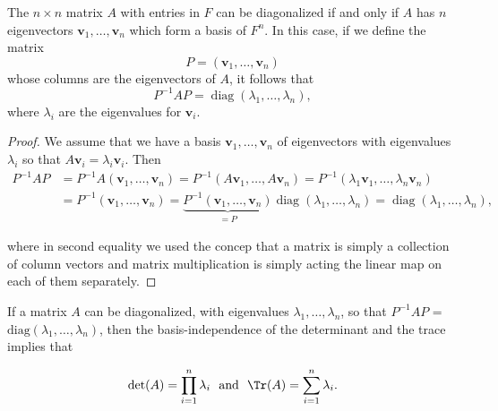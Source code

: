 \documentclass[a4paper,12pt]{report}
\begin{document}
\begin{lemma} \label{diagonalizable} 
The \( n \times n \) matrix \( A \) with entries in \( F \) can be diagonalized if and only if \( A \) has \( n \) eigenvectors \( \mathbf{v}_1, \ldots, \mathbf{v}_n \) which form a basis of \( F^n \). In this case, if we define the matrix
\begin{equation}
    P = (\mathbf{v}_1, \ldots, \mathbf{v}_n)
\end{equation}
whose columns are the eigenvectors of \( A \), it follows that
\begin{equation}
    P^{-1} A P = \operatorname{diag}(\lambda_1, \ldots, \lambda_n),
\end{equation}
where \( \lambda_i \) are the eigenvalues for \( \mathbf{v}_i \).
\end{lemma}

\begin{proof}
We assume that we have a basis \( \mathbf{v}_1, \dots, \mathbf{v}_n \) of eigenvectors with eigenvalues \( \lambda_i \) so that \(A \mathbf{v}_i = \lambda_i \mathbf{v}_i\). Then
\begin{equation}
\begin{aligned}
P^{-1} A P &= P^{-1} A (\mathbf{v}_1, \dots, \mathbf{v}_n) 
           = P^{-1} (A \mathbf{v}_1, \dots, A \mathbf{v}_n) 
           = P^{-1} (\lambda_1 \mathbf{v}_1, \dots, \lambda_n \mathbf{v}_n) \\
           &= P^{-1} (\mathbf{v}_1, \dots, \mathbf{v}_n) 
           = \underbrace{P^{-1} (\mathbf{v}_1, \dots, \mathbf{v}_n)}_{=P} 
           \operatorname{diag}(\lambda_1, \dots, \lambda_n) 
           = \operatorname{diag}(\lambda_1, \dots, \lambda_n),
\end{aligned}
\end{equation}

where in second equality we used the concep that a matrix is simply a collection of column vectors and matrix multiplication is simply acting the linear map on each of them separately.
\end{proof}



If a matrix \(A\) can be diagonalized, with eigenvalues \(\lambda _{1}, \ldots , \lambda _{n}   \), so that \(P^{-1} AP\) = \(\text{diag}(\lambda _{1}, \ldots , \lambda _{n}  ) \), then the basis-independence of the determinant and the trace implies that

\begin{equation}
    \det (A) = \prod_{i=1}^{n} \lambda _{i} ~\text { and }~  \Tr (A) = \sum_{i=1}^{n} \lambda _{i}.  
\end{equation}
\end{document}
